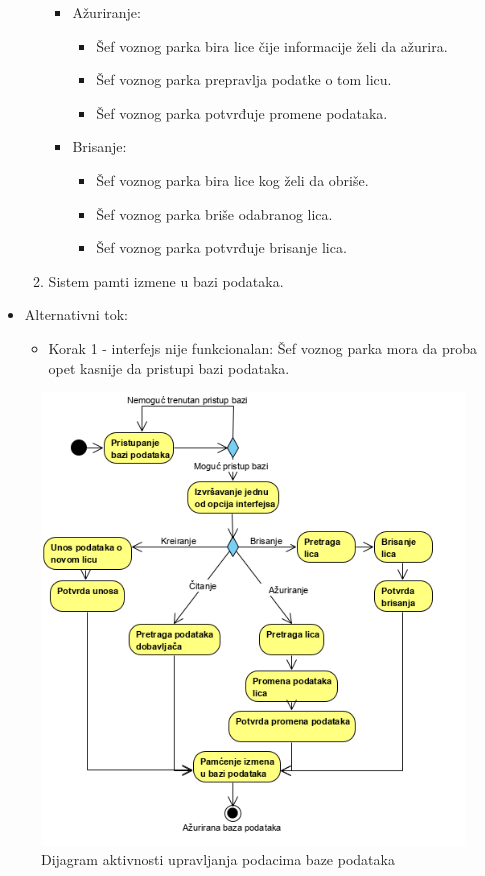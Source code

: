 \begin{itemize}
\begin{enumerate}
\begin{itemize}
                \item Ažuriranje:
                \begin{itemize}
                    \item Šef voznog parka bira lice čije informacije želi da ažurira.
                    \item Šef voznog parka prepravlja podatke o tom licu.
                    \item Šef voznog parka potvrđuje promene podataka.
                \end{itemize}
                \item Brisanje:
                \begin{itemize}
                    \item Šef voznog parka bira lice kog želi da obriše.
                    \item Šef voznog parka briše odabranog lica.
                    \item Šef voznog parka potvrđuje brisanje lica.
                \end{itemize}
            \end{itemize}
		\item Sistem pamti izmene u bazi podataka.
		\end{enumerate}
	\item Alternativni tok:
		\begin{itemize}
		    \item Korak 1 - interfejs nije funkcionalan: Šef voznog parka mora da proba opet kasnije da pristupi bazi podataka.
		\end{itemize}
\end{itemize}

\begin{figure}[H]
\begin{center}
\includegraphics[scale=1.25]{Slike/UpravljanjePodacima.png}
\end{center}
    \caption{Dijagram aktivnosti upravljanja podacima baze podataka}
\label{fig:UpravljanjePodacima}
\end{figure}